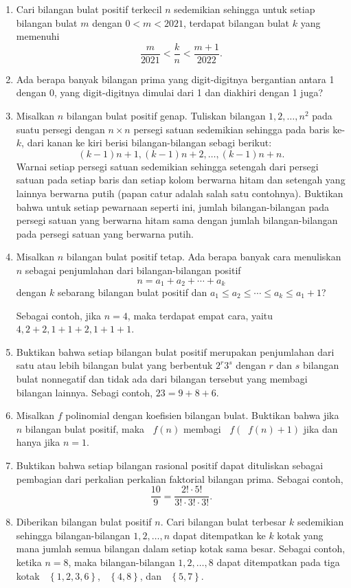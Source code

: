 \documentclass[12pt]{article}
\newcommand*\lrbr[1]{\mathop{}\!\left\lbrace#1\right\rbrace}
\newcommand*\func[2]{\mathop{}\!{#1}{\left({#2}\right)}}
\begin{document}
\begin{enumerate}[leftmargin=*]
		\item Cari bilangan bulat positif terkecil $ n $ sedemikian sehingga untuk setiap bilangan bulat $ m $ dengan $ 0 < m < 2021 $, terdapat bilangan bulat $ k $ yang memenuhi
		\[ \frac{m}{2021} < \frac{k}{n} < \frac{m + 1}{2022}. \]
		\item Ada berapa banyak bilangan prima yang digit-digitnya bergantian antara 1 dengan 0, yang digit-digitnya dimulai dari 1 dan diakhiri dengan 1 juga?
		\item Misalkan $ n $ bilangan bulat positif genap. Tuliskan bilangan $ 1, 2, \dots, n^{2} $ pada suatu persegi dengan $ n \times n $ persegi satuan sedemikian sehingga pada baris ke-$ k $, dari kanan ke kiri berisi bilangan-bilangan sebagi berikut:
		\[ \left(k - 1\right)n + 1, \left(k - 1\right)n + 2, \dots, \left(k - 1\right)n + n. \]
		Warnai setiap persegi satuan sedemikian sehingga setengah dari persegi satuan pada setiap baris dan setiap kolom berwarna hitam dan setengah yang lainnya berwarna putih (papan catur adalah salah satu contohnya). Buktikan bahwa untuk setiap pewarnaan seperti ini, jumlah bilangan-bilangan pada persegi satuan yang berwarna hitam sama dengan jumlah bilangan-bilangan pada persegi satuan yang berwarna putih.
		\item Misalkan $ n $ bilangan bulat positif tetap. Ada berapa banyak cara menuliskan $ n $ sebagai penjumlahan dari bilangan-bilangan positif
		\[ n = a_{1} + a_{2} + \cdots + a_{k} \]
		dengan $ k $ sebarang bilangan bulat positif dan $ a_{1} \leq a_{2} \leq \cdots \leq a_{k} \leq a_{1} + 1 $?
		\par \noindent Sebagai contoh, jika $ n = 4 $, maka terdapat empat cara, yaitu $ 4, 2 + 2, 1 + 1 + 2, 1 + 1 + 1 $.
		\item Buktikan bahwa setiap bilangan bulat positif merupakan penjumlahan dari satu atau lebih bilangan bulat yang berbentuk $ 2^{r}3^{s} $ dengan $ r $ dan $ s $ bilangan bulat nonnegatif dan tidak ada dari bilangan tersebut yang membagi bilangan lainnya. Sebagi contoh, $ 23 = 9 + 8 + 6 $.
		\item Misalkan $ f $ polinomial dengan koefisien bilangan bulat. Buktikan bahwa jika $ n $ bilangan bulat positif, maka $ \func{f}{n} $ membagi $ \func{f}{\func{f}{n} + 1} $ jika dan hanya jika $ n = 1 $.
		\item Buktikan bahwa setiap bilangan rasional positif dapat dituliskan sebagai pembagian dari perkalian perkalian faktorial bilangan prima. Sebagai contoh,
		\[ \frac{10}{9} = \frac{2! \cdot 5!}{3! \cdot 3! \cdot 3!}. \]
		\item Diberikan bilangan bulat positif $ n $. Cari bilangan bulat terbesar $ k $ sedemikian sehingga bilangan-bilangan $ 1, 2, \dots, n $ dapat ditempatkan ke $ k $ kotak yang mana jumlah semua bilangan dalam setiap kotak sama besar. Sebagai contoh, ketika $ n = 8 $, maka bilangan-bilangan $ 1, 2, \dots, 8 $ dapat ditempatkan pada tiga kotak $ \lrbr{1, 2, 3, 6} $, $ \lrbr{4, 8} $, dan $ \lrbr{5, 7} $.

\end{enumerate}
\end{document}
